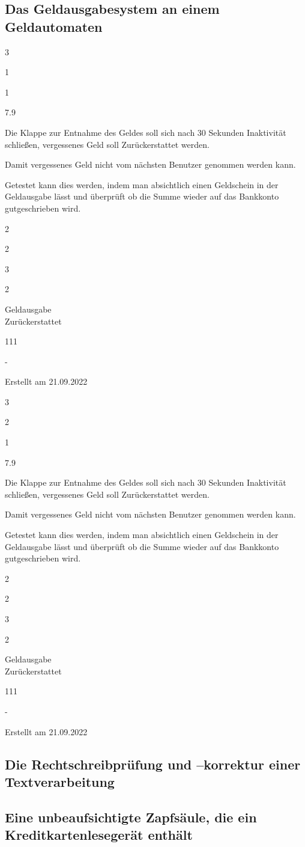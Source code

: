 \documentclass[12pt]{article}
\newenvironment{myreq}[1]{%
\setlist[description]{font=\normalfont\color{darkgray}}%
\begin{tcolorbox}[colframe=black,colback=white, sharp corners, boxrule=1pt]%
\bfseries\color{blue}%
\begin{description}#1}%
{\end{description}\end{tcolorbox}}
\newcommand{\threeinline}[3]{\begin{multicols}{3}#1 #2 #3\end{multicols}}
\newcommand{\twoinline}[2]{\begin{multicols}{2}#1 #2\end{multicols}}
\newcommand{\reqno}{\item[Requirement \#:]}
\newcommand{\reqtype}{\item[Requirement Type:]}
\newcommand{\reqevent}{\item[Event/BUC/PUC \#:]}
\newcommand{\reqdesc}{\item[Description:]}
\newcommand{\reqrat}{\item[Rationale:]}
\newcommand{\reqfit}{\item[Fit Criterion:]}
\newcommand{\reqsatis}{\item[Customer Satisfaction:]}
\newcommand{\reqdissat}{\item[Customer Dissatisfaction:]}
\newcommand{\reqdep}{\item[Dependencies:]}
\newcommand{\reqconf}{\item[Conflicts:]}
\newcommand{\reqmater}{\item[Materials:]}
\newcommand{\reqhist}{\item[History:]}
\begin{document}
\subsection{Das Geldausgabesystem an einem Geldautomaten}
\begin{myreq}
  \threeinline
    {\reqno 1}
    {\reqtype 1}
    {\reqevent 7.9}
  \reqdesc Die Klappe zur Entnahme des Geldes soll sich nach 30 Sekunden Inaktivität schließen, vergessenes Geld soll Zurückerstattet werden.
  \reqrat Damit vergessenes Geld nicht vom nächsten Benutzer genommen werden kann.
  \reqfit Getestet kann dies werden, indem man absichtlich einen Geldschein in der Geldausgabe lässt und überprüft ob die Summe wieder auf das Bankkonto gutgeschrieben wird.
  \twoinline
    {\reqsatis 2}
    {\reqdissat 3}
  \twoinline
  {\reqdep Geldausgabe\\Zurückerstattet}
  {\reqconf 111}
  \reqmater -
  \reqhist Erstellt am 21.09.2022
\end{myreq}

\begin{myreq}
  \threeinline
    {\reqno 2}
    {\reqtype 1}
    {\reqevent 7.9}
  \reqdesc Die Klappe zur Entnahme des Geldes soll sich nach 30 Sekunden Inaktivität schließen, vergessenes Geld soll Zurückerstattet werden.
  \reqrat Damit vergessenes Geld nicht vom nächsten Benutzer genommen werden kann.
  \reqfit Getestet kann dies werden, indem man absichtlich einen Geldschein in der Geldausgabe lässt und überprüft ob die Summe wieder auf das Bankkonto gutgeschrieben wird.
  \twoinline
    {\reqsatis 2}
    {\reqdissat 3}
  \twoinline
  {\reqdep Geldausgabe\\Zurückerstattet}
  {\reqconf 111}
  \reqmater -
  \reqhist Erstellt am 21.09.2022
\end{myreq}

\subsection{Die Rechtschreibprüfung und –korrektur einer Textverarbeitung}
\subsection{Eine unbeaufsichtigte Zapfsäule, die ein Kreditkartenlesegerät enthält}
\pagebreak
\printbibliography
\end{document}
